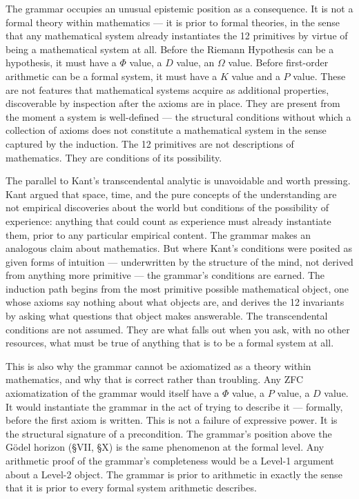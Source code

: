 \documentclass[12pt,a4paper]{article}
\newcommand{\pilcrow}{\S}
\begin{document}
The grammar occupies an unusual epistemic position as a consequence. It is not a formal theory within mathematics --- it is prior to formal theories, in the sense that any mathematical system already instantiates the 12 primitives by virtue of being a mathematical system at all. Before the Riemann Hypothesis can be a hypothesis, it must have a $\Phi$ value, a $D$ value, an $\Omega$ value. Before first-order arithmetic can be a formal system, it must have a $K$ value and a $P$ value. These are not features that mathematical systems acquire as additional properties, discoverable by inspection after the axioms are in place. They are present from the moment a system is well-defined --- the structural conditions without which a collection of axioms does not constitute a mathematical system in the sense captured by the induction. The 12 primitives are not descriptions of mathematics. They are conditions of its possibility.

The parallel to Kant's transcendental analytic is unavoidable and worth pressing. Kant argued that space, time, and the pure concepts of the understanding are not empirical discoveries about the world but conditions of the possibility of experience: anything that could count as experience must already instantiate them, prior to any particular empirical content. The grammar makes an analogous claim about mathematics. But where Kant's conditions were posited as given forms of intuition --- underwritten by the structure of the mind, not derived from anything more primitive --- the grammar's conditions are earned. The induction path begins from the most primitive possible mathematical object, one whose axioms say nothing about what objects are, and derives the 12 invariants by asking what questions that object makes answerable. The transcendental conditions are not assumed. They are what falls out when you ask, with no other resources, what must be true of anything that is to be a formal system at all.

This is also why the grammar cannot be axiomatized as a theory within mathematics, and why that is correct rather than troubling. Any ZFC axiomatization of the grammar would itself have a $\Phi$ value, a $P$ value, a $D$ value. It would instantiate the grammar in the act of trying to describe it --- formally, before the first axiom is written. This is not a failure of expressive power. It is the structural signature of a precondition. The grammar's position above the G\"odel horizon (\pilcrow{}VII, \pilcrow{}X) is the same phenomenon at the formal level. Any arithmetic proof of the grammar's completeness would be a Level-1 argument about a Level-2 object. The grammar is prior to arithmetic in exactly the sense that it is prior to every formal system arithmetic describes.
\end{document}
